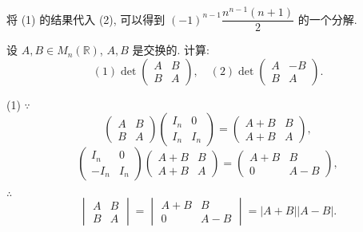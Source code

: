 \documentclass[color=black,device=normal,lang=cn,mode=geye]{elegantnote}
\begin{document}
\begin{note}
    将 (1) 的结果代入 (2), 可以得到 $(-1)^{n-1}\dfrac{n^{n-1}(n+1)}{2}$ 的一个分解.
\end{note}
\begin{exercisec}
    设 $A,B\in M_n(\mathbb{R})$, $A,B$ 是交换的. 计算:
    \[(1)\det\begin{pmatrix}
        A & B \\
        B & A
    \end{pmatrix},\quad(2)\det\begin{pmatrix}
        A & -B \\
        B & A
    \end{pmatrix}.\]
\end{exercisec}
\begin{solution}
    (1) $\because$
    \[\begin{pmatrix}
        A & B \\
        B & A
    \end{pmatrix}\begin{pmatrix}
        I_n & 0 \\
        I_n & I_n
    \end{pmatrix}=\begin{pmatrix}
        A+B & B \\
        A+B & A
    \end{pmatrix},\]
    \[\begin{pmatrix}
        I_n & 0 \\
        -I_n & I_n
    \end{pmatrix}\begin{pmatrix}
        A+B & B \\
        A+B & A
    \end{pmatrix}=\begin{pmatrix}
        A+B & B \\
        0 & A-B
    \end{pmatrix},\]

    $\therefore$
    \[\begin{vmatrix}
        A & B \\
        B & A
    \end{vmatrix}=\begin{vmatrix}
        A+B & B \\
        0 & A-B
    \end{vmatrix}=|A+B||A-B|.\]


\end{solution}
\end{document}
